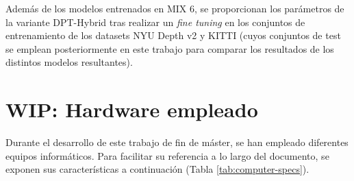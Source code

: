 \documentclass[a4paper]{article}
\begin{document}
Además de los modelos entrenados en MIX 6, se proporcionan los parámetros de la variante DPT-Hybrid tras realizar un \textit{fine tuning} en los conjuntos de entrenamiento de los datasets NYU Depth v2 y KITTI (cuyos conjuntos de test se emplean posteriormente en este trabajo para comparar los resultados de los distintos modelos resultantes). 



\clearpage
\section{WIP: Hardware empleado}

Durante el desarrollo de este trabajo de fin de máster, se han empleado diferentes equipos informáticos. Para facilitar su referencia a lo largo del documento, se exponen sus características a continuación (Tabla \ref{tab:computer-specs}).

\end{document}
